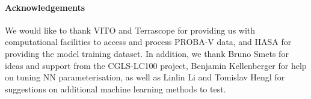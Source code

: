 \documentclass[review,authoryear,3p]{elsarticle}
\newcommand{\minisection}[1]{\paragraph{#1}}%
\begin{document}
\minisection{Acknowledgements} We would like to thank VITO and Terrascope for providing us with computational facilities to access and process {PROBA-V} data, and IIASA for providing the model training dataset. In addition, we thank Bruno Smets for ideas and support from the \gls{CGLS-LC100} project, Benjamin Kellenberger for help on tuning \gls{NN} parameterisation, as well as Linlin Li and Tomislav Hengl for suggestions on additional machine learning methods to test.






\end{document}
